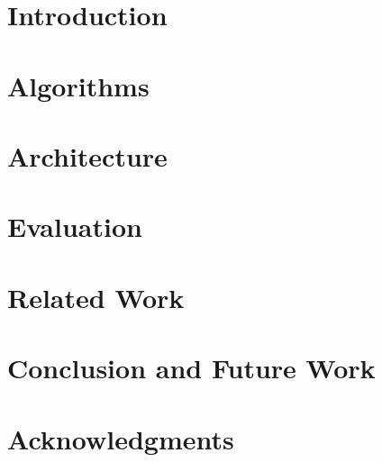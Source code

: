 \documentclass{acm_proc_article-sp}
\begin{document}


  
  
  ~\\~\\~\\~\\~\\~\\~\\
  
  \section{Introduction}
  \label{introduction}
  
  
  \section{Algorithms}
  \label{algorithms}
  
  
  \section{Architecture}
  \label{architecture}
  
  
  \section{Evaluation}
  \label{evaluation}
  
  
  \section{Related Work}
  \label{relatedwork}
  
  
  \section{Conclusion and Future Work}
  \label{conclusionandfuturework}
  
  
  \section{Acknowledgments}
  \label{acknowledgments}
  

  \balance

  
  
\end{document}
